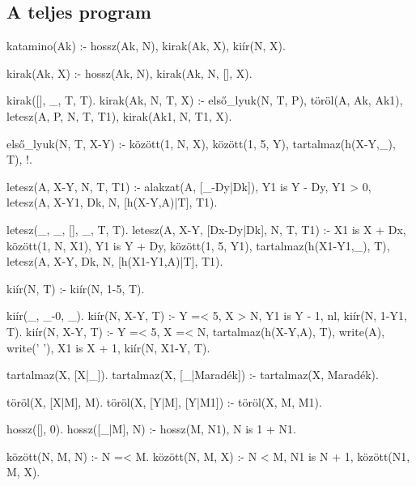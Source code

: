 \subsection*{A teljes program}
\begin{program}
katamino(Ak) :-
    hossz(Ak, N), kirak(Ak, X), kiír(N, X).


kirak(Ak, X) :- hossz(Ak, N), kirak(Ak, N, [], X).

kirak([], _, T, T).
kirak(Ak, N, T, X) :-
    első_lyuk(N, T, P),
    töröl(A, Ak, Ak1),
    letesz(A, P, N, T, T1),
    kirak(Ak1, N, T1, X).

első_lyuk(N, T, X-Y) :-
    között(1, N, X), között(1, 5, Y),
    \+ tartalmaz(h(X-Y,_), T), !.

letesz(A, X-Y, N, T, T1) :-
    alakzat(A, [_-Dy|Dk]),
    Y1 is Y - Dy, Y1 > 0,
    letesz(A, X-Y1, Dk, N, [h(X-Y,A)|T], T1).

letesz(_, _, [], _, T, T).
letesz(A, X-Y, [Dx-Dy|Dk], N, T, T1) :-
    X1 is X + Dx, között(1, N, X1),
    Y1 is Y + Dy, között(1, 5, Y1),
    \+ tartalmaz(h(X1-Y1,_), T),
    letesz(A, X-Y, Dk, N, [h(X1-Y1,A)|T], T1).


kiír(N, T) :- kiír(N, 1-5, T).

kiír(_, _-0, _).
kiír(N, X-Y, T) :-
    Y =< 5, X > N, Y1 is Y - 1,
    nl, kiír(N, 1-Y1, T).
kiír(N, X-Y, T) :-
    Y =< 5, X =< N,
    tartalmaz(h(X-Y,A), T),
    write(A), write(' '),
    X1 is X + 1,
    kiír(N, X1-Y, T).


tartalmaz(X, [X|_]).
tartalmaz(X, [_|Maradék]) :- tartalmaz(X, Maradék).

töröl(X, [X|M], M).
töröl(X, [Y|M], [Y|M1]) :- töröl(X, M, M1).

hossz([], 0).
hossz([_|M], N) :- hossz(M, N1), N is 1 + N1.

között(N, M, N) :- N =< M.
között(N, M, X) :-
    N < M, N1 is N + 1,
    között(N1, M, X).



\end{program}
